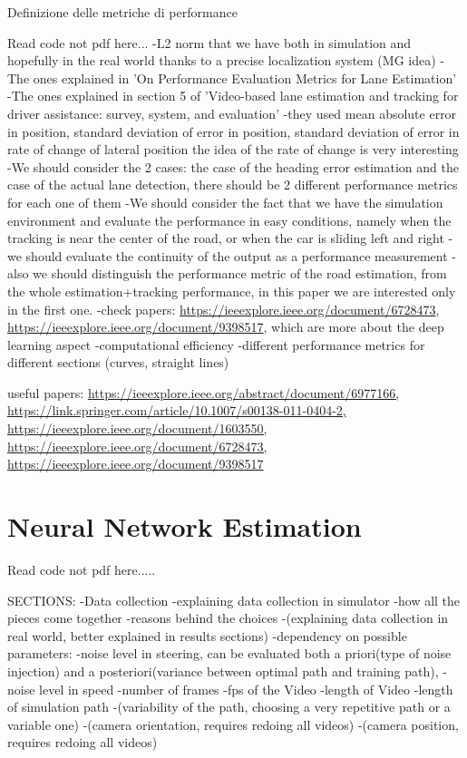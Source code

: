\documentclass[a4paper,12pt,sort&compress]{article}
\begin{document}
    Definizione delle metriche di  performance

    Read code not pdf here...
    -L2 norm that we have both in simulation and hopefully in the real world thanks to a precise
    localization system (MG idea)
    -The ones explained in 'On Performance Evaluation Metrics for Lane Estimation'
    -The ones explained in section 5 of 'Video-based lane estimation and tracking for driver assistance: survey, system, and evaluation'
        -they used mean absolute error in position, standard deviation of error in position, standard
        deviation of error in rate of change of lateral position
            the idea of the rate of change is very interesting
    -We should consider the 2 cases: the case of the heading error estimation and the case of the
    actual lane detection, there should be 2 different performance metrics for each one of them
    -We should consider the fact that we have the simulation environment and evaluate the performance
    in easy conditions, namely when the tracking is near the center of the road, or when the car is
    sliding left and right
    -we should evaluate the continuity of the output as a performance measurement
    -also we should distinguish the performance metric of the road estimation, from the whole
    estimation+tracking performance, in this paper we are interested only in the first one. 
    -check papers: \url{https://ieeexplore.ieee.org/document/6728473},
    \url{https://ieeexplore.ieee.org/document/9398517}, which are more about the deep learning
    aspect
    -computational efficiency
    -different performance metrics for different sections (curves, straight lines)
    
    useful papers:
    \url{https://ieeexplore.ieee.org/abstract/document/6977166, https://link.springer.com/article/10.1007/s00138-011-0404-2, https://ieeexplore.ieee.org/document/1603550, https://ieeexplore.ieee.org/document/6728473,  https://ieeexplore.ieee.org/document/9398517} 


\newpage

\section{Neural Network Estimation}

Read code not pdf here.....

SECTIONS:
-Data collection
    -explaining data collection in simulator
        -how all the pieces come together
        -reasons behind the choices
    -(explaining data collection in real world, better explained in results sections)
    -dependency on possible parameters:
        -noise level in steering, can be evaluated both a priori(type of noise injection) and a
        posteriori(variance between optimal path and training path), 
        -noise level in speed
        -number of frames
        -fps of the Video
        -length of Video
        -length of simulation path
        -(variability of the path, choosing a very repetitive path or a variable one)
        -(camera orientation, requires redoing all videos)
        -(camera position, requires redoing all videos)
\end{document}
